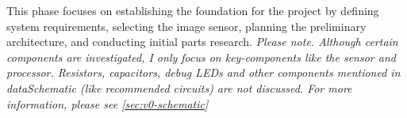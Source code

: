 This phase focuses on establishing the foundation for the project by defining system requirements, selecting the image sensor, planning the preliminary architecture, and conducting initial parts research.
\nl
\textit{Please note. Although certain components are investigated, I only focus on key-components like the sensor and processor. Resistors, capacitors, debug LEDs and other components mentioned in dataSchematic (like recommended circuits) are not discussed. For more information, please see \autoref{sec:v0-schematic}}
